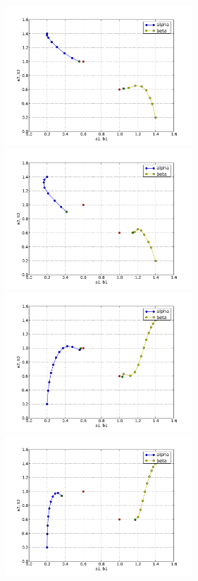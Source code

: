 \begin{figure}
  \begin{center}
    \includegraphics[width=7cm]{chapters/schroll/pdf/4Dscan1b.pdf}
    \includegraphics[width=7cm]{chapters/schroll/pdf/4Dscan1b-5.pdf}
    \includegraphics[width=7cm]{chapters/schroll/pdf/4Dscan2b.pdf}
    \includegraphics[width=7cm]{chapters/schroll/pdf/4Dscan2b-5.pdf}

\end{center}
\end{figure}
